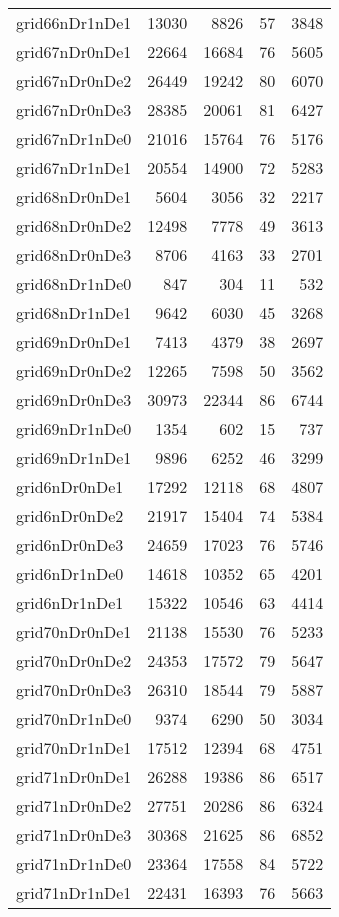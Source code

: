 \begin{longtable}{lrrrr}
grid66nDr1nDe1 & 13030 & 8826 & 57 & 3848 \\
grid67nDr0nDe1 & 22664 & 16684 & 76 & 5605 \\
grid67nDr0nDe2 & 26449 & 19242 & 80 & 6070 \\
grid67nDr0nDe3 & 28385 & 20061 & 81 & 6427 \\
grid67nDr1nDe0 & 21016 & 15764 & 76 & 5176 \\
grid67nDr1nDe1 & 20554 & 14900 & 72 & 5283 \\
grid68nDr0nDe1 & 5604 & 3056 & 32 & 2217 \\
grid68nDr0nDe2 & 12498 & 7778 & 49 & 3613 \\
grid68nDr0nDe3 & 8706 & 4163 & 33 & 2701 \\
grid68nDr1nDe0 & 847 & 304 & 11 & 532 \\
grid68nDr1nDe1 & 9642 & 6030 & 45 & 3268 \\
grid69nDr0nDe1 & 7413 & 4379 & 38 & 2697 \\
grid69nDr0nDe2 & 12265 & 7598 & 50 & 3562 \\
grid69nDr0nDe3 & 30973 & 22344 & 86 & 6744 \\
grid69nDr1nDe0 & 1354 & 602 & 15 & 737 \\
grid69nDr1nDe1 & 9896 & 6252 & 46 & 3299 \\
grid6nDr0nDe1 & 17292 & 12118 & 68 & 4807 \\
grid6nDr0nDe2 & 21917 & 15404 & 74 & 5384 \\
grid6nDr0nDe3 & 24659 & 17023 & 76 & 5746 \\
grid6nDr1nDe0 & 14618 & 10352 & 65 & 4201 \\
grid6nDr1nDe1 & 15322 & 10546 & 63 & 4414 \\
grid70nDr0nDe1 & 21138 & 15530 & 76 & 5233 \\
grid70nDr0nDe2 & 24353 & 17572 & 79 & 5647 \\
grid70nDr0nDe3 & 26310 & 18544 & 79 & 5887 \\
grid70nDr1nDe0 & 9374 & 6290 & 50 & 3034 \\
grid70nDr1nDe1 & 17512 & 12394 & 68 & 4751 \\
grid71nDr0nDe1 & 26288 & 19386 & 86 & 6517 \\
grid71nDr0nDe2 & 27751 & 20286 & 86 & 6324 \\
grid71nDr0nDe3 & 30368 & 21625 & 86 & 6852 \\
grid71nDr1nDe0 & 23364 & 17558 & 84 & 5722 \\
grid71nDr1nDe1 & 22431 & 16393 & 76 & 5663 \\

\end{longtable}
